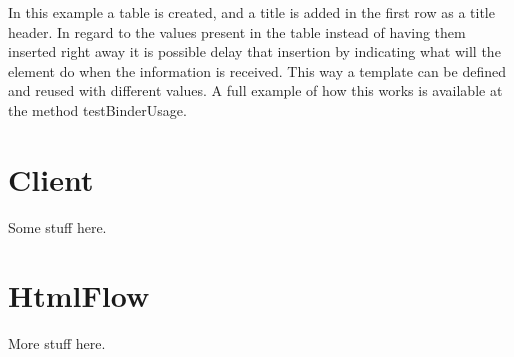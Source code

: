 \noindent
In this example a table is created, and a title is added in the first row as a title header. In regard to the values present in the table instead of having them inserted right away it is possible delay that insertion by indicating what will the element do when the information is received. This way a template can be defined and reused with different values. A full example of how this works is available at the method testBinderUsage. 

\section{Client} %
\label{sec:client}

Some stuff here.

\section{HtmlFlow}
\label{sec:htmlflow}

More stuff here.
